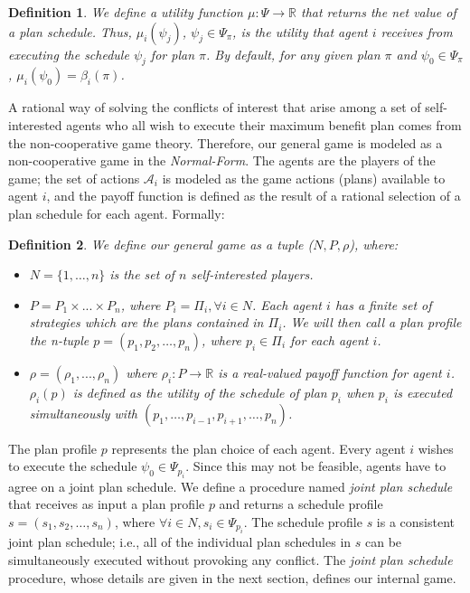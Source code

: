 \documentclass[letterpaper]{article}
\newcommand{\A}{{\mathcal A}}
\newtheorem{definition}{Definition}
\begin{document}
\begin{definition} We define a utility function $\mu: \Psi \rightarrow \mathbb{R}$ that returns the net value of a plan schedule. Thus, $\mu_i (\psi_j)$, $\psi_j \in \Psi_{\pi}$, is the utility that agent $i$ receives from executing the schedule $\psi_j$ for plan $\pi$. By default, for any given plan $\pi$ and $\psi_0 \in \Psi_{\pi}$, $\mu_i (\psi_0) = \beta_i(\pi)$.
\end{definition}

A rational way of solving the conflicts of interest that arise among a set of self-interested agents who all wish to execute their maximum benefit plan comes from the non-cooperative game theory. Therefore, our general game is modeled as a non-cooperative game in the \emph{Normal-Form}. The agents are the players of the game; the set of actions $\A_i$ is modeled as the game actions (plans) available to agent $i$, and the payoff function is defined as the result of a rational selection of a plan schedule for each agent. Formally:

\begin{definition} We define our general game as a tuple ($N, P, \rho$), where:
\begin{itemize}
\item $N=\{1, \ldots, n\}$ is the set of $n$ self-interested players.
\item $P=P_1 \times ... \times P_n$, where $P_i=\Pi_i, \forall i \in N$. Each agent $i$ has a finite set of strategies which are the plans contained in $\Pi_i$. We will then call a \emph{plan profile} the n-tuple $p=(p_1, p_2, \ldots, p_n)$, where $ p_i \in \Pi_i$ for each agent $i$.
\item $\rho=(\rho_1,...,\rho_n)$ where $\rho_i: P \rightarrow \mathbb{R}$ is a real-valued payoff function for agent $i$. $\rho_i(p)$ is defined as the utility of the schedule of plan $p_i$ when $p_i$ is executed simultaneously with $(p_1, \ldots, p_{i-1}, p_{i+1}, \ldots, p_n)$.
\end{itemize}
\end{definition}

The plan profile $p$ represents the plan choice of each agent. Every agent $i$ wishes to execute the schedule $\psi_0 \in \Psi_{p_i}$. Since this may not be feasible, agents have to agree on a joint plan schedule. We define a procedure named \emph{joint plan schedule} that receives as input a plan profile $p$ and returns a schedule profile $s=(s_1, s_2, \ldots, s_n)$, where $\forall i \in N, s_i \in \Psi_{p_i}$. The schedule profile $s$ is a consistent joint plan schedule; i.e., all of the individual plan schedules in $s$ can be simultaneously executed without provoking any conflict. The \emph{joint plan schedule} procedure, whose details are given in the next section, defines our internal game.
\end{document}
